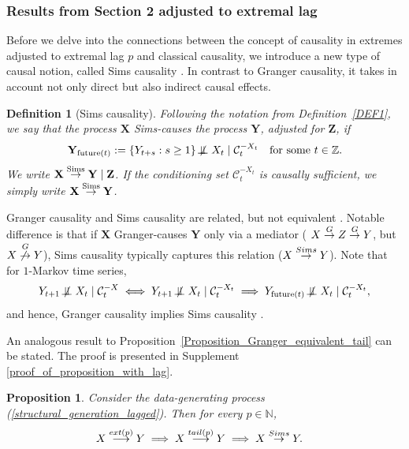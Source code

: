 \documentclass[a4paper,11pt]{article}
\newtheorem{proposition}{Proposition}
\newtheorem{definition}{Definition}
\newcommand{\indep}{\perp\kern-5.5pt\perp}
\newcommand{\notindep}{\not\!\indep}
\newcommand{\toverset}[2]{\overset{{\rm #1}}{#2}}
\DeclareMathOperator{\future}{future}
\begin{document}
\subsubsection{Results from Section 2 adjusted to extremal lag}
\label{appendix_lag_section2}
Before we delve into the connections between the concept of causality in extremes adjusted to extremal lag $p$ and classical causality, we introduce a new type of causal notion, called Sims causality \citep{sims,GrangerSims2, GrangerSims}. In contrast to Granger causality, it takes in account not only direct but also indirect causal effects.

\begin{definition}[Sims causality]\label{Definition_Sims}
Following the notation from Definition~\ref{DEF1}, we say that the process \(\mathbf X\)
Sims-causes the process \(\mathbf Y\), adjusted for \(\mathbf Z\), if
\[
    \mathbf Y_{\future(t)}
    :=
    \{Y_{t+s}:s\ge 1\}
    \notindep X_t
    \mid \mathcal C_t^{-X_t}
    \quad \text{for some } t\in\mathbb Z.
\]
We write \(\mathbf X\toverset{\mathrm{Sims}}{\to}\mathbf Y\mid\mathbf Z\). If the conditioning
set \(\mathcal C_t^{-X_t}\) is causally sufficient, we simply write
\(\mathbf X\toverset{\mathrm{Sims}}{\to}\mathbf Y\).
\end{definition}

Granger causality and Sims causality are related, but not equivalent \citep{GrangerSims}. Notable difference is that if $\textbf{X}$ Granger-causes $\textbf{Y}$ only via a mediator ( $\textbf{X}\toverset{G}{\to}\textbf{Z}\toverset{G}{\to}\textbf{Y}$, but $\textbf{X}\toverset{G}{\not\to}\textbf{Y}$), Sims causality typically captures this relation ($\textbf{X}\toverset{Sims}{\to}\textbf{Y}$). Note that for $1$-Markov time series,
\begin{equation*}
    \begin{split}
Y_{t+1}\notindep X_t \mid \mathcal{C}^{-\textbf{X}}_t \iff Y_{t+1} \notindep X_t \mid   \mathcal{C}^{-X_t}_t \implies 
\textbf{Y}_{\future(t)} \notindep X_t \mid    \mathcal{C}^{-X_t}_t,
    \end{split}
\end{equation*}
 and hence, Granger causality implies Sims causality \citep{GrangerSims}. 

 An analogous result to Proposition~\ref{Proposition_Granger_equivalent_tail} can be stated. The proof is presented in Supplement \ref{proof_of_proposition_with_lag}. 

\begin{proposition}\label{proposition_with_lag_1}
Consider the data-generating process (\ref{structural_generation_lagged}). Then for every $p\in\mathbb{N}$, 
\begin{equation*}
    \begin{split}
   \textbf{X}\overset{{\rm ext}(p)}{\longrightarrow}\textbf{Y}    &\implies \textbf{X}\overset{{\rm tail}(p)}{\longrightarrow}\textbf{Y}    
    \implies \textbf{X}\toverset{Sims}{\to}\textbf{Y}.  
    \end{split}
\end{equation*}
\end{proposition}
\end{document}
